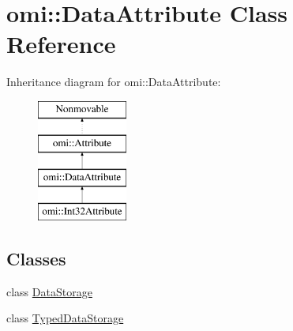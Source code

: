 \hypertarget{classomi_1_1_data_attribute}{}\section{omi\+:\+:Data\+Attribute Class Reference}
\label{classomi_1_1_data_attribute}
Inheritance diagram for omi\+:\+:Data\+Attribute\+:\begin{figure}[H]
\begin{center}
\leavevmode
\includegraphics[height=4.000000cm]{classomi_1_1_data_attribute}
\end{center}
\end{figure}
\subsection*{Classes}
\begin{DoxyCompactItemize}
\item 
class \hyperlink{classomi_1_1_data_attribute_1_1_data_storage}{Data\+Storage}
\item 
class \hyperlink{classomi_1_1_data_attribute_1_1_typed_data_storage}{Typed\+Data\+Storage}
\end{DoxyCompactItemize}
